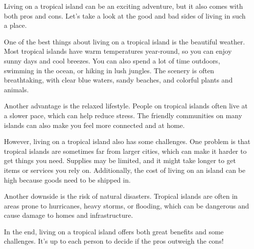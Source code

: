 \documentclass[12pt]{article}
\begin{document}
\begin{tcolorbox}[colframe=black!60, colback=white, 
coltitle=black, colbacktitle=black!15, fonttitle=\bfseries\Large, 
title=Text: Island Life, halign title=center, left=10pt, right=10pt, top=10pt, bottom=15pt]
Living on a tropical island can be an exciting adventure, but it also comes with both pros and cons. Let’s take a look at the good and bad sides of living in such a place.


One of the best things about living on a tropical island is the beautiful weather. Most tropical islands have warm temperatures year-round, so you can enjoy sunny days and cool breezes. You can also spend a lot of time outdoors, swimming in the ocean, or hiking in lush jungles. The scenery is often breathtaking, with clear blue waters, sandy beaches, and colorful plants and animals.

Another advantage is the relaxed lifestyle. People on tropical islands often live at a slower pace, which can help reduce stress. The friendly communities on many islands can also make you feel more connected and at home.


However, living on a tropical island also has some challenges. One problem is that tropical islands are sometimes far from larger cities, which can make it harder to get things you need. Supplies may be limited, and it might take longer to get items or services you rely on. Additionally, the cost of living on an island can be high because goods need to be shipped in.

Another downside is the risk of natural disasters. Tropical islands are often in areas prone to hurricanes, heavy storms, or flooding, which can be dangerous and cause damage to homes and infrastructure.

In the end, living on a tropical island offers both great benefits and some challenges. It’s up to each person to decide if the pros outweigh the cons!

 

 
\end{tcolorbox}
\end{document}
